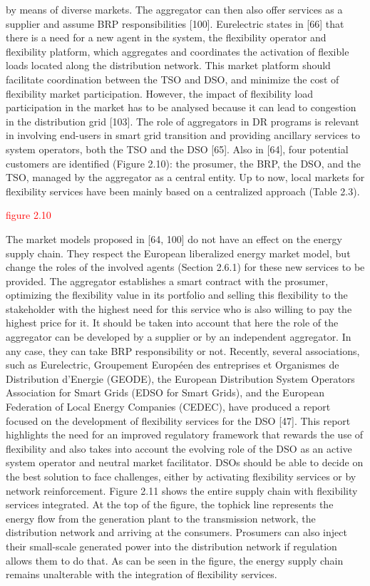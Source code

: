 by means of diverse markets. The aggregator can then also offer services as a supplier and assume BRP responsibilities [100]. Eurelectric states in [66] that there is a need for a new agent in the system, the flexibility operator and flexibility platform, which aggregates and coordinates the activation of flexible loads located along the distribution network. This market platform should facilitate coordination between the TSO and DSO, and minimize the cost of flexibility market participation. However, the impact of flexibility load participation in the market has to be analysed because it can lead to congestion in the distribution grid [103]. The role of aggregators in DR programs is relevant in involving end-users in smart grid transition and providing ancillary services to system operators, both the TSO and the DSO [65].
Also in [64], four potential customers are identified (Figure 2.10): the prosumer, the BRP, the DSO, and the TSO, managed by the aggregator as a central entity. Up to now, local markets for flexibility services have been mainly based on a centralized approach (Table 2.3).

\textcolor{red}{figure 2.10} 

The market models proposed in [64, 100] do not have an effect on the energy supply chain. They respect the European liberalized energy market model, but change the roles of the involved agents (Section 2.6.1) for these new services to be provided. The aggregator establishes a smart contract with the prosumer, optimizing the flexibility value in its portfolio and selling this flexibility to the stakeholder with the highest need for this service who is also willing to pay the highest price for it. It should be taken into account that here the role of the aggregator can be developed by a supplier or by an independent aggregator. In any case, they can take BRP responsibility or not.
Recently, several associations, such as Eurelectric, Groupement Européen des entreprises et Organismes de Distribution d'Energie (GEODE), the European Distribution System Operators Association for Smart Grids (EDSO for Smart Grids), and the European Federation of Local Energy Companies (CEDEC), have produced a report focused on the development of flexibility services for the DSO [47]. This report highlights the need for an improved regulatory framework that rewards the use of flexibility and also takes into account the evolving role of the DSO as an active system operator and neutral market facilitator. DSOs should be able to decide on the best solution to face challenges, either by activating flexibility services or by network reinforcement.
Figure 2.11 shows the entire supply chain with flexibility services integrated. At the top of the figure, the tophick line represents the energy flow from the generation plant to the transmission network, the distribution network and arriving at the consumers. Prosumers can also inject their small-scale generated power into the distribution network if regulation allows them to do that. As can be seen in the figure, the energy supply chain remains unalterable with the integration of flexibility services.

